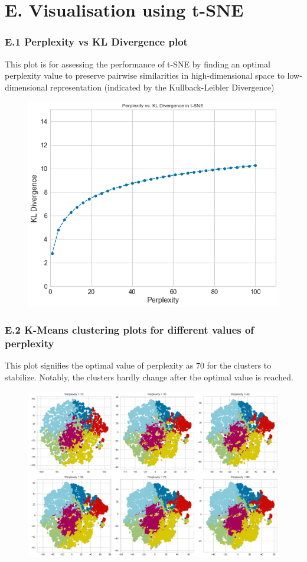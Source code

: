\documentclass{article}
\begin{document}
\section*{E. Visualisation using t-SNE}
\label{app:TSNEPerp}
\subsubsection*{E.1 Perplexity vs KL Divergence plot}
This plot is for assessing the performance of t-SNE by finding an optimal perplexity value to preserve pairwise similarities in high-dimensional space to low-dimensional representation (indicated by the Kullback-Leibler Divergence)
\begin{figure}[H]
    \centering
    \includegraphics[width=0.76\linewidth]{Images/KL.png}
\end{figure}


\subsubsection*{E.2 K-Means clustering plots for different values of perplexity}
This plot signifies the optimal value of perplexity as 70 for the clusters to stabilize. Notably, the clusters hardly change after the optimal value is reached.
\begin{figure}[H]
    \centering
    \includegraphics[width=0.88\linewidth]{Images/TSNE.png}
\end{figure}
\end{document}
